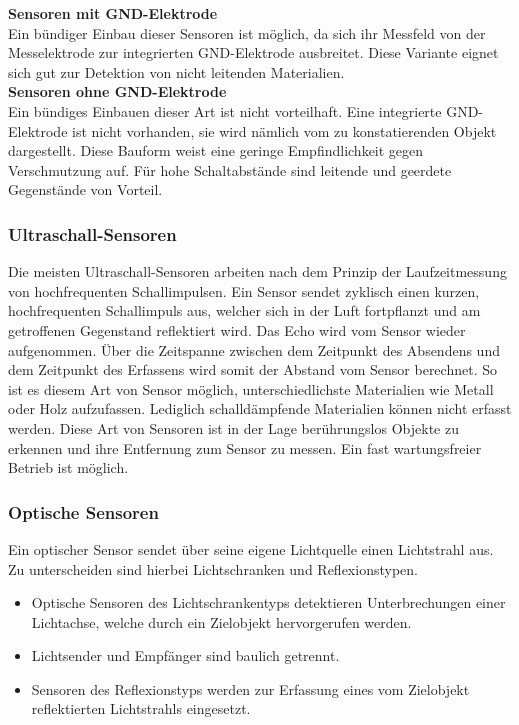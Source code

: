 \textbf{Sensoren mit GND-Elektrode} \\
Ein bündiger Einbau dieser Sensoren ist möglich, da sich ihr Messfeld von der Messelektrode zur integrierten GND-Elektrode ausbreitet.
Diese Variante eignet sich gut zur Detektion von nicht leitenden Materialien. \\

\textbf{Sensoren ohne GND-Elektrode} \\
Ein bündiges Einbauen dieser Art ist nicht vorteilhaft.
Eine integrierte GND-Elektrode ist nicht vorhanden, sie wird nämlich vom zu konstatierenden Objekt dargestellt.
Diese Bauform weist eine geringe Empfindlichkeit gegen Verschmutzung auf.
Für hohe Schaltabstände sind leitende und geerdete Gegenstände von Vorteil.

\subsubsection{Ultraschall-Sensoren}
Die meisten Ultraschall-Sensoren arbeiten nach dem Prinzip der Laufzeitmessung von hochfrequenten Schallimpulsen.
Ein Sensor sendet zyklisch einen kurzen, hochfrequenten Schallimpuls aus, welcher sich in der Luft fortpflanzt und am getroffenen Gegenstand reflektiert wird.
Das Echo wird vom Sensor wieder aufgenommen.
Über die Zeitspanne zwischen dem Zeitpunkt des Absendens und dem Zeitpunkt des Erfassens wird somit der Abstand vom Sensor berechnet.
So ist es diesem Art von Sensor möglich, unterschiedlichste Materialien wie Metall oder Holz aufzufassen.
Lediglich schalldämpfende Materialien können nicht erfasst werden.
Diese Art von Sensoren ist in der Lage berührungslos Objekte zu erkennen und ihre Entfernung zum Sensor zu messen.
Ein fast wartungsfreier Betrieb ist möglich.

\subsubsection{Optische Sensoren}
Ein optischer Sensor sendet über seine eigene Lichtquelle einen Lichtstrahl aus.
Zu unterscheiden sind hierbei Lichtschranken und Reflexionstypen.

\begin{itemize}
    \item Optische Sensoren des Lichtschrankentyps detektieren Unterbrechungen einer Lichtachse, welche durch ein Zielobjekt hervorgerufen werden.
    \item Lichtsender und Empfänger sind baulich getrennt.

    \item Sensoren des Reflexionstyps werden zur Erfassung eines vom Zielobjekt reflektierten Lichtstrahls eingesetzt.
\end{itemize}

